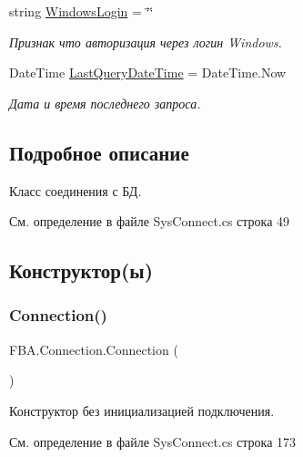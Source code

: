 \begin{DoxyCompactItemize}
string \mbox{\hyperlink{class_f_b_a_1_1_connection_a3f41df8459a0eaf38857a233720dd1d0}{Windows\+Login}} = \char`\"{}\char`\"{}
\begin{DoxyCompactList}\small\item\em Признак что авторизация через логин Windows. \end{DoxyCompactList}\item 
Date\+Time \mbox{\hyperlink{class_f_b_a_1_1_connection_a11c6e4dac8775fc197a3b468dcff23cc}{Last\+Query\+Date\+Time}} = Date\+Time.\+Now
\begin{DoxyCompactList}\small\item\em Дата и время последнего запроса. \end{DoxyCompactList}\end{DoxyCompactItemize}


\subsection{Подробное описание}
Класс соединения с БД. 

См. определение в файле Sys\+Connect.\+cs строка 49



\subsection{Конструктор(ы)}
\mbox{\label{class_f_b_a_1_1_connection_ae4e944521bb94857288224ca9f20245a}} 
\subsubsection{\texorpdfstring{Connection()}{Connection()}\hspace{0.1cm}{\footnotesize\ttfamily [1/2]}}
{\footnotesize\ttfamily F\+B\+A.\+Connection.\+Connection (\begin{DoxyParamCaption}{ }\end{DoxyParamCaption})}



Конструктор без инициализацией подключения. 



См. определение в файле Sys\+Connect.\+cs строка 173

\mbox{\label{class_f_b_a_1_1_connection_a085fd480090159a0192a3cfdc2075574}} 
